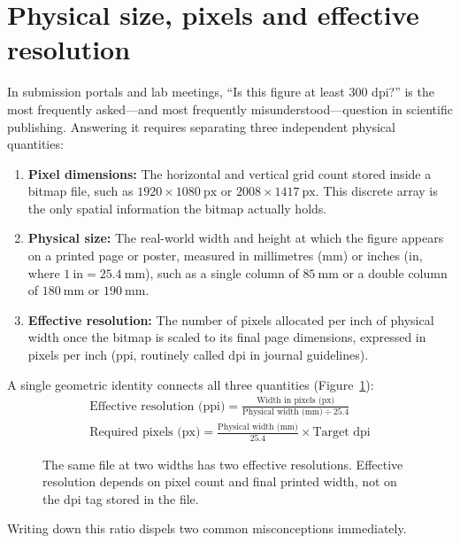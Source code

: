 \section{Physical size, pixels and effective resolution}

In submission portals and lab meetings, ``Is this figure at least 300 dpi?'' is the most frequently asked---and most frequently misunderstood---question in scientific publishing. Answering it requires separating three independent physical quantities:

\begin{enumerate}
\item \textbf{Pixel dimensions:} The horizontal and vertical grid count stored inside a bitmap file, such as $1920 \times 1080\ \text{px}$ or $2008 \times 1417\ \text{px}$. This discrete array is the only spatial information the bitmap actually holds.
\item \textbf{Physical size:} The real-world width and height at which the figure appears on a printed page or poster, measured in millimetres ($\text{mm}$) or inches ($\text{in}$, where $1\ \text{in} = 25.4\ \text{mm}$), such as a single column of $85\ \text{mm}$ or a double column of $180\ \text{mm}$ or $190\ \text{mm}$.
\item \textbf{Effective resolution:} The number of pixels allocated per inch of physical width once the bitmap is scaled to its final page dimensions, expressed in pixels per inch ($\text{ppi}$, routinely called $\text{dpi}$ in journal guidelines).
\end{enumerate}

A single geometric identity connects all three quantities (Figure~\ref{fig:ch13-01}):
\begin{gather*}
\text{Effective resolution (ppi)} = \frac{\text{Width in pixels (px)}}{\text{Physical width (mm)} \div 25.4} \\[3pt]
\text{Required pixels (px)} = \frac{\text{Physical width (mm)}}{25.4} \times \text{Target dpi}
\end{gather*}

\begin{figure}[htbp]\centering
\makebox[\linewidth][c]{}
\caption{The same file at two widths has two effective resolutions. Effective resolution depends on pixel count and final printed width, not on the dpi tag stored in the file.}\label{fig:ch13-01}
\end{figure}

Writing down this ratio dispels two common misconceptions immediately.

